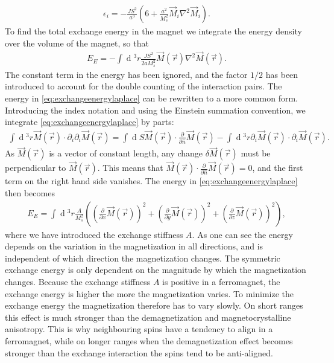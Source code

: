 \documentclass[12pt, a4paper, twoside, openright]{article}		%
\renewcommand{\d}[1]{\ensuremath{\operatorname{d}\!{#1}}}
\numberwithin{equation}{section}
\begin{document}
\begin{align}
\epsilon_i = -\frac{JS^2}{a^3}\left(6+\frac{a^2}{M_s^2}\vec{M}_i\nabla^2\vec{M}_i\right).
\end{align}
To find the total exchange energy in the magnet we integrate the energy density over the volume of the magnet, so that
\begin{align}
\label{eq:exchangeenergylaplace}
E_E = -\int \d {^3}r \frac{JS^2}{2aM_s^2} \vec{M}(\vec{r})\nabla^2\vec{M}(\vec{r}).
\end{align}
The constant term in the energy has been ignored, and the factor $1/2$ has been introduced to account for the double counting of the interaction pairs. The energy in \eqref{eq:exchangeenergylaplace} can be rewritten to a more common form. Introducing the index notation and using the Einstein summation convention, we integrate \eqref{eq:exchangeenergylaplace} by parts: 
\begin{align}
\label{eq:exchangeenergyDiv2}
\int \d {^3}r \vec{M}(\vec{r})\cdot\partial_i \partial_i \vec{M}(\vec{r}) = \int \d S \vec{M}(\vec{r})\cdot \frac{\partial}{\partial \hat{n}}\vec{M}(\vec{r}) - \int \d {^3}r \partial_i  \vec{M}(\vec{r})\cdot\partial_i \vec{M}(\vec{r}).
\end{align}
As $\vec{M}(\vec{r})$ is a vector of constant length, any change $\delta \vec{M}(\vec{r})$ must be perpendicular to $\vec{M}(\vec{r})$. This means that $\vec{M}(\vec{r})\cdot \frac{\partial}{\partial \hat{n}}\vec{M}(\vec{r}) = 0$, and the first term on the right hand side vanishes. The energy in \eqref{eq:exchangeenergylaplace} then becomes
\begin{align}
\label{eq:exchangeenergy}
E_E = \int \d {^3}r \frac{A}{M_s^2} \left((\frac{\partial}{\partial x}\vec{M}(\vec{r}))^2+(\frac{\partial}{\partial y}\vec{M}(\vec{r}))^2+(\frac{\partial}{\partial z}\vec{M}(\vec{r}))^2\right),
\end{align}
where we have introduced the exchange stiffness $A$. As one can see the energy depends on the variation in the magnetization in all directions, and is independent of which direction the magnetization changes. The symmetric exchange energy is only dependent on the magnitude by which the magnetization changes. Because the exchange stiffness $A$ is positive in a ferromagnet, the exchange energy is higher the more the magnetization varies. To minimize the exchange energy the magnetization therefore has to vary slowly. On short ranges this effect is much stronger than the demagnetization and magnetocrystalline anisotropy. This is why neighbouring spins have a tendency to align in a ferromagnet, while on longer ranges when the demagnetization effect becomes stronger than the exchange interaction the spins tend to be anti-aligned.
\end{document}
